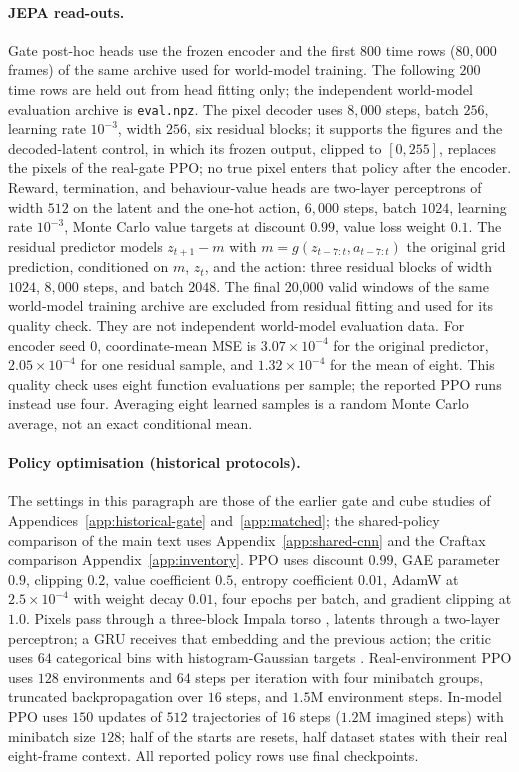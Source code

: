 \paragraph{JEPA read-outs.}
Gate post-hoc heads use the frozen encoder and the first $800$ time rows ($80{,}000$ frames) of the same archive used for world-model training. The following $200$ time rows are held out from head fitting only; the independent world-model evaluation archive is \texttt{eval.npz}. The pixel decoder uses $8{,}000$ steps, batch $256$, learning
rate $10^{-3}$, width $256$, six residual blocks; it supports the figures and the decoded-latent control, in which its frozen output, clipped to $[0,255]$, replaces the pixels of the real-gate PPO; no true pixel enters that policy after the encoder. Reward,
termination, and behaviour-value heads are two-layer perceptrons of width $512$ on the latent and the
one-hot action, $6{,}000$ steps, batch $1024$, learning rate $10^{-3}$, Monte Carlo value targets at
discount $0.99$, value loss weight $0.1$. The residual predictor models $z_{t+1}-m$ with
$m=g(z_{t-7:t},a_{t-7:t})$ the original grid prediction, conditioned on $m$, $z_t$, and the action:
three residual blocks of width $1024$, $8{,}000$ steps, and batch $2048$. The final 20,000 valid
windows of the same world-model training archive are excluded from residual fitting and used for
its quality check. They are not independent world-model evaluation data. For encoder seed 0,
coordinate-mean MSE is $3.07\times10^{-4}$ for the original predictor, $2.05\times10^{-4}$ for one
residual sample, and $1.32\times10^{-4}$ for the mean of eight. This quality check uses eight function
evaluations per sample; the reported PPO runs instead use four. Averaging eight learned samples is
a random Monte Carlo average, not an exact conditional mean.

\paragraph{Policy optimisation (historical protocols).}
The settings in this paragraph are those of the earlier gate and cube studies of
Appendices~\ref{app:historical-gate} and~\ref{app:matched}; the shared-policy comparison of the main
text uses Appendix~\ref{app:shared-cnn} and the Craftax comparison Appendix~\ref{app:inventory}.
PPO uses discount $0.99$, GAE parameter $0.9$, clipping $0.2$, value coefficient $0.5$, entropy
coefficient $0.01$, AdamW at $2.5\times10^{-4}$ with weight decay $0.01$, four epochs per batch, and
gradient clipping at $1.0$. Pixels pass through a three-block Impala torso \citep{espeholt2018impala}, latents through a two-layer
perceptron; a GRU receives that embedding and the previous action; the critic uses $64$ categorical
bins with histogram-Gaussian targets \citep{farebrother2024stopregressing}. Real-environment PPO uses $128$ environments and $64$ steps per
iteration with four minibatch groups, truncated backpropagation over $16$ steps, and $1.5$M
environment steps. In-model PPO uses $150$ updates of $512$ trajectories of $16$ steps ($1.2$M
imagined steps) with minibatch size $128$; half of the starts are resets, half dataset states with
their real eight-frame context. All reported policy rows use final checkpoints.

